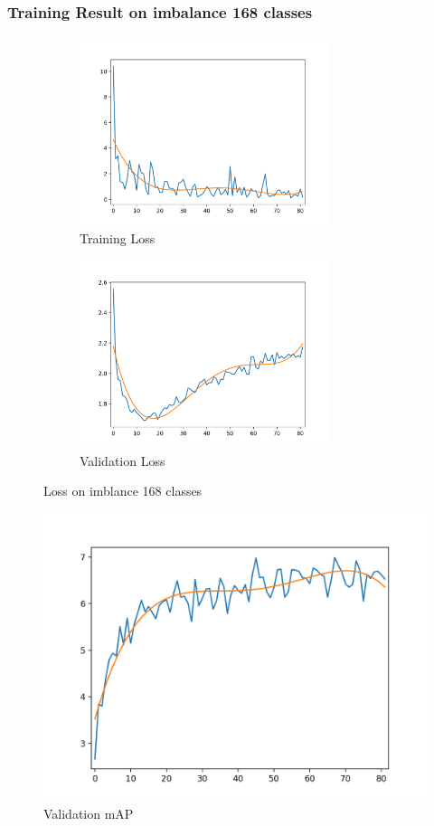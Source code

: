 \documentclass[12pt,a4paper]{report}
\begin{document}
\newpage



\subsubsection{Training Result on imbalance 168 classes}
\begin{figure}[h]
\begin{subfigure}{0.5\linewidth}
	\includegraphics[height=5.5cm,width=\textwidth]{train_loss_exect168.png}
	\caption{Training Loss}
\end{subfigure}
\begin{subfigure}{0.5\linewidth}
	\includegraphics[height=5.5cm,width=\textwidth]{val_loss_exect168.png}
	\caption{Validation Loss}
\end{subfigure}
\label{Training set 1}
\caption{Loss on imblance 168 classes }

\end{figure}
\begin{figure}[h]
\centering
\includegraphics[width=0.6\linewidth]{map_exect168.png}
\caption{Validation mAP}
\end{figure}
\newpage
\end{document}
